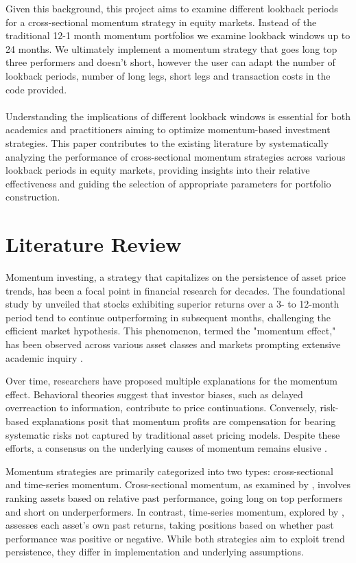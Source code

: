 \documentclass[a4paper,12pt,twoside]{article}
\begin{document}
Given this background, this project aims to examine different lookback periods for a cross-sectional momentum strategy in equity markets. Instead of the traditional 12-1 month momentum portfolios we examine lookback windows up to 24 months. We ultimately implement a momentum strategy that goes long top three performers and doesn't short, however the user can adapt the number of lookback periods, number of long legs, short legs and transaction costs in the code provided.
\\~\\
Understanding the implications of different lookback windows is essential for both academics and practitioners aiming to optimize momentum-based investment strategies. This paper contributes to the existing literature by systematically analyzing the performance of cross-sectional momentum strategies across various lookback periods in equity markets, providing insights into their relative effectiveness and guiding the selection of appropriate parameters for portfolio construction.
\newpage
\section{Literature Review}
Momentum investing, a strategy that capitalizes on the persistence of asset price trends, has been a focal point in financial research for decades. The foundational study by \cite{jegadeesh1993returns} unveiled that stocks exhibiting superior returns over a 3- to 12-month period tend to continue outperforming in subsequent months, challenging the efficient market hypothesis. This phenomenon, termed the "momentum effect," has been observed across various asset classes and markets prompting extensive academic inquiry \citep{asness2013value, baltas2013momentum}.

Over time, researchers have proposed multiple explanations for the momentum effect. Behavioral theories suggest that investor biases, such as delayed overreaction to information, contribute to price continuations. Conversely, risk-based explanations posit that momentum profits are compensation for bearing systematic risks not captured by traditional asset pricing models. Despite these efforts, a consensus on the underlying causes of momentum remains elusive \citep{barberis1998model, grinblatt2005prospect, bikhchandani1992theory}.

Momentum strategies are primarily categorized into two types: cross-sectional and time-series momentum. Cross-sectional momentum, as examined by \cite{jegadeesh1993returns}, involves ranking assets based on relative past performance, going long on top performers and short on underperformers. In contrast, time-series momentum, explored by \cite{moskowitz2012time}, assesses each asset's own past returns, taking positions based on whether past performance was positive or negative. While both strategies aim to exploit trend persistence, they differ in implementation and underlying assumptions.
\end{document}
